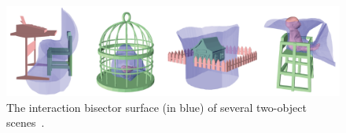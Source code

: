 
\begin{figure}[t] \centering
    \includegraphics[width=0.99\linewidth]{fig/img/zhao_tog14_ibs}
    \caption{
    The interaction bisector surface (in blue) of several two-object scenes~\protect\cite{Zhao:2014:ISU}.
    }
    \label{fig:zhao_tog14_ibs}
\end{figure}
